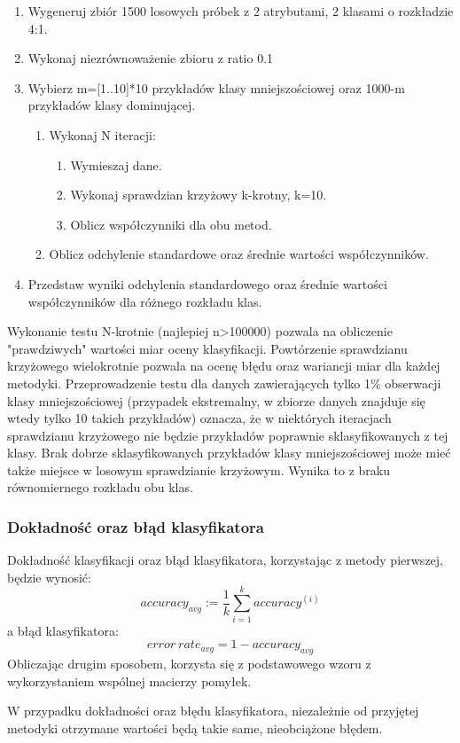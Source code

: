 \begin{enumerate}
	\item Wygeneruj zbiór 1500 losowych próbek z 2 atrybutami, 2 klasami o rozkładzie 4:1.
	\item Wykonaj niezrównoważenie zbioru z ratio 0.1
	\item Wybierz m=[1..10]*10 przykładów klasy mniejszościowej oraz 1000-m przykładów klasy dominującej.
	\begin{enumerate}
		\item  Wykonaj N iteracji:
		\begin{enumerate}
			\item Wymieszaj dane.
			\item Wykonaj sprawdzian krzyżowy k-krotny, k=10.
			\item Oblicz współczynniki dla obu metod.
		\end{enumerate}
		\item Oblicz odchylenie standardowe oraz średnie wartości współczynników.
	\end{enumerate}
	\item Przedstaw wyniki odchylenia standardowego oraz średnie wartości współczynników dla różnego rozkładu klas.
\end{enumerate}
Wykonanie testu N-krotnie (najlepiej n>100000) pozwala na obliczenie "prawdziwych" wartości miar oceny klasyfikacji. Powtórzenie sprawdzianu krzyżowego wielokrotnie pozwala na ocenę błędu oraz wariancji miar dla każdej metodyki. Przeprowadzenie testu dla danych zawierających tylko 1\% obserwacji klasy mniejszościowej (przypadek ekstremalny, w zbiorze danych znajduje się wtedy tylko 10 takich przykładów) oznacza, że w niektórych iteracjach sprawdzianu krzyżowego nie będzie przykładów poprawnie sklasyfikowanych z tej klasy. Brak dobrze sklasyfikowanych przykładów klasy mniejszościowej może mieć także miejsce w losowym sprawdzianie krzyżowym. Wynika to z braku równomiernego rozkładu obu klas. 
\subsubsection{Dokładność oraz błąd klasyfikatora}
Dokładność klasyfikacji oraz błąd klasyfikatora, korzystając z metody pierwszej, będzie wynosić:
\[accuracy_{avg} := \frac{1}{k} \sum_{i=1}^{k} accuracy^{(i)}\]
a błąd klasyfikatora:
\[error\ rate_{avg} = 1 - accuracy_{avg}\]
Obliczając drugim sposobem, korzysta się z podstawowego wzoru z wykorzystaniem wspólnej macierzy pomyłek. \par
W przypadku dokładności oraz błędu klasyfikatora, niezależnie od przyjętej metodyki otrzymane wartości będą takie same, nieobciążone błędem.
